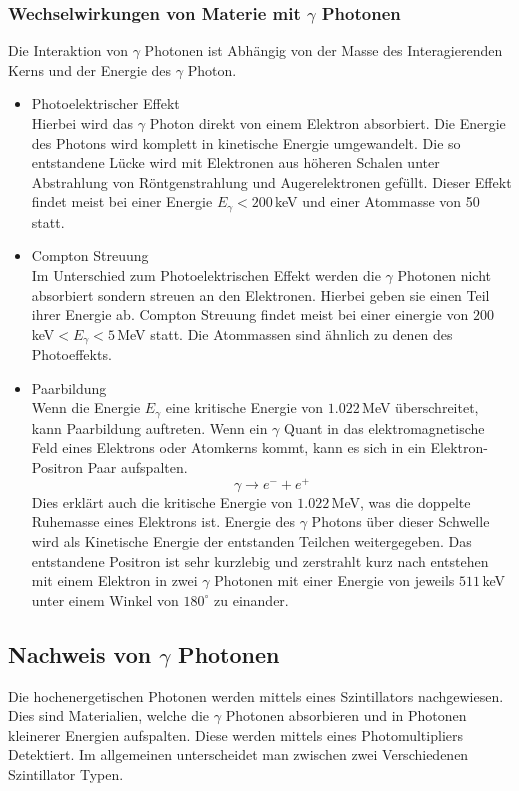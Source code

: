 \subsubsection{Wechselwirkungen von Materie mit $\gamma$ Photonen}
Die Interaktion von $\gamma$ Photonen ist Abhängig von der Masse des Interagierenden Kerns und der Energie des $\gamma$ Photon.
\begin{itemize}
	\item Photoelektrischer Effekt\\
	Hierbei wird das $\gamma$ Photon direkt von einem Elektron absorbiert. Die Energie des Photons wird komplett in kinetische Energie umgewandelt. Die so entstandene Lücke wird mit Elektronen aus höheren Schalen unter Abstrahlung von Röntgenstrahlung und Augerelektronen gefüllt. Dieser Effekt findet meist bei einer Energie $E_\gamma<200\,$keV und einer Atommasse von 50 statt.

	\item Compton Streuung\\
	Im Unterschied zum Photoelektrischen Effekt werden die $\gamma$ Photonen nicht absorbiert sondern streuen an den Elektronen. Hierbei geben sie einen Teil ihrer Energie ab.
	Compton Streuung findet meist bei einer einergie von $200\,$keV$<E_\gamma<5\,$MeV statt. Die Atommassen sind ähnlich zu denen des Photoeffekts.
	
	\item Paarbildung\\
	Wenn die Energie $E_\gamma$ eine kritische Energie von $1.022\,$MeV überschreitet, kann Paarbildung auftreten. Wenn ein $\gamma$ Quant in das elektromagnetische Feld eines Elektrons oder Atomkerns kommt, kann es sich in ein Elektron-Positron Paar aufspalten. 
		$$\gamma \rightarrow e^- + e^+$$
	Dies erklärt auch die kritische Energie von $1.022\,$MeV, was die doppelte Ruhemasse eines Elektrons ist. Energie des $\gamma$ Photons über dieser Schwelle wird als Kinetische Energie der entstanden Teilchen  weitergegeben. 
	Das entstandene Positron ist sehr kurzlebig und zerstrahlt kurz nach entstehen mit einem Elektron in zwei $\gamma$ Photonen mit einer Energie von jeweils $511\,$keV unter einem Winkel von $180^\circ$ zu einander. 
\end{itemize}

\subsection{Nachweis von $\gamma$ Photonen}
Die hochenergetischen Photonen werden mittels eines Szintillators nachgewiesen. Dies sind Materialien, welche die $\gamma$ Photonen absorbieren und in Photonen kleinerer Energien aufspalten. Diese werden mittels eines Photomultipliers Detektiert. 
Im allgemeinen unterscheidet man zwischen zwei Verschiedenen Szintillator Typen.
